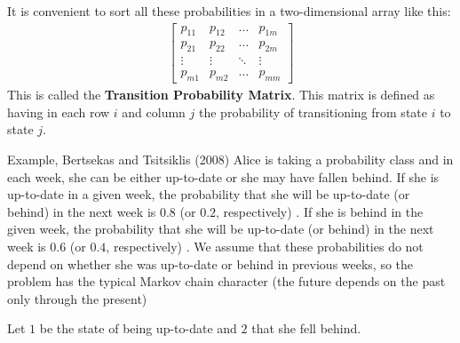 \documentclass[aspectratio=169]{beamer}
\begin{document}
\begin{frame}
    It is convenient to sort all these probabilities in a two-dimensional array like this:
    \begin{align*}
        \begin{bmatrix}
            p_{11}&p_{12}&\hdots&p_{1m}\\
            p_{21}&p_{22}&\hdots&p_{2m}\\
            \vdots&\vdots &\ddots & \vdots\\
            p_{m1}&p_{m2}&\hdots&p_{mm}
        \end{bmatrix}
    \end{align*}
    This is called the \textbf{Transition Probability Matrix}. This matrix is defined as having in each
    row $i$ and column $j$ the probability of transitioning from state $i$ to state $j$.
\end{frame}

\begin{frame}{Example, Bertsekas and Tsitsiklis (2008)}
    Alice is taking a probability class and in each week, she can be
    either up-to-date or she may have fallen behind. If she is up-to-date in a given
    week, the probability that she will be up-to-date (or behind) in the next week is
    $0.8$ (or $0.2$, respectively) . If she is behind in the given week, the probability that
    she will be up-to-date (or behind) in the next week is $0.6$ (or $0.4$, respectively) . We
    assume that these probabilities do not depend on whether she was up-to-date or
    behind in previous weeks, so the problem has the typical Markov chain character
    (the future depends on the past only through the present)
\end{frame}

\begin{frame}
    Let $1$ be the state of being up-to-date and $2$ that she fell behind.

    \vspace{0.5em}

    \vspace{0.5em}



\end{frame}
\end{document}
